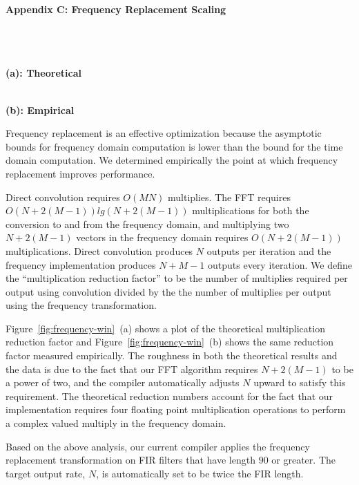 {\bf Appendix C:  Frequency Replacement Scaling} \\ ~ \\ ~ \\



\begin{figure*}[t]
\center
\begin{minipage}{3.4 in}
\center
\epsfxsize=2.2in
 \\
{\bf (a): Theoretical}
\end{minipage} 
\begin{minipage}{3.4 in}
\center
\epsfxsize=2.2in
 \\
{\bf (b): Empirical}
\end{minipage}
\caption{Plots showing the theoretical and empirical multiplication reduction factor as a function of the size of the FIR ($M$) and the number of outputs produced per calculation ($N$). The dark regions denote an increase in the required number of multiplications and the light regions a reduction.}
\label{fig:frequency-win}
\end{figure*}

Frequency replacement is an effective optimization because the asymptotic bounds for 
frequency domain computation is lower than the bound for the time domain computation. 
We determined empirically the point at which frequency replacement improves performance.
  
Direct convolution requires $O(MN)$ multiplies. 
The FFT requires $O(N+2(M-1))lg(N+2(M-1))$ multiplications for both the
conversion to and from the frequency domain, and multiplying two $N+2(M-1)$
vectors in the frequency domain requires $O(N+2(M-1))$ multiplications. 
Direct convolution produces $N$ outputs per iteration and the frequency implementation 
produces $N+M-1$ outputs every iteration. 
We define the ``multiplication reduction factor''
to be the number of multiplies required per output using convolution divided by the 
the number of multiplies per output using the frequency transformation.

Figure~\ref{fig:frequency-win}~(a) shows a plot of the theoretical multiplication reduction factor
and Figure~\ref{fig:frequency-win}~(b) shows the same reduction factor measured empirically. 
The roughness in both the theoretical results and the data is due to the fact that
our FFT algorithm requires $N+2(M-1)$ to be a power of two, and the compiler
automatically adjusts $N$ upward to satisfy this requirement. The theoretical 
reduction numbers account for the fact that our implementation requires four 
floating point multiplication operations to perform a complex valued multiply 
in the frequency domain.

Based on the above analysis, our current compiler applies the frequency replacement
transformation on FIR filters that have length $90$ or greater. The target output
rate, $N$, is automatically set to be twice the FIR length.
